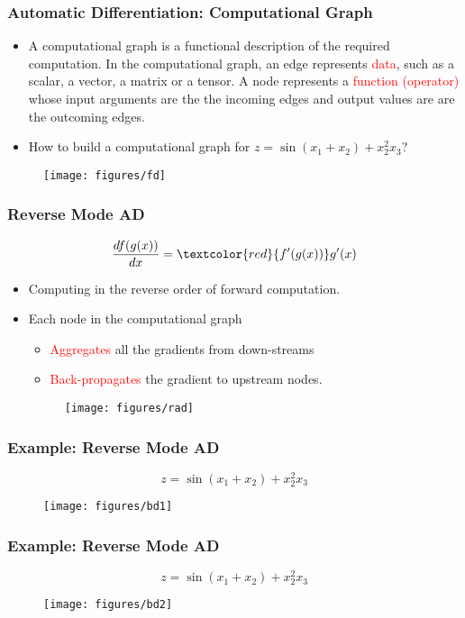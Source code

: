 \documentclass[usenames,dvipsnames]{beamer}
\newcommand{\red}[1]{\textcolor{red}{#1}}
\begin{document}
\begin{frame}
	\frametitle{Automatic Differentiation: Computational Graph}
	
	\begin{itemize}
		\item A computational graph is a functional description of the required computation. In the computational graph, an edge represents \textcolor{red}{data}, such as a scalar, a vector, a matrix or a tensor. A node represents a \textcolor{red}{function (operator)} whose input arguments are the the incoming edges and output values are are the outcoming edges. 
		\item How to build a computational graph for $z = \sin(x_1+x_2) + x_2^2 x_3$?
	\end{itemize}
	
	\begin{figure}[hbt]
  \texttt{[image: figures/fd]}
\end{figure}
\end{frame}

\begin{frame}
	\frametitle{Reverse Mode AD}
	$$\frac{df(g(x))}{dx} = \red{f'(g(x))} g'(x)$$
	\begin{itemize}
		\item Computing in the reverse order of forward computation. 
		\item Each node in the computational graph
		\begin{itemize}
		\item \red{Aggregates} all the gradients from down-streams 
		\item \red{Back-propagates} the gradient to upstream nodes.  
		\end{itemize}
		\begin{figure}[hbt]
  \texttt{[image: figures/rad]}
\end{figure}

	\end{itemize}
\end{frame}


\begin{frame}
\frametitle{Example: Reverse Mode AD}	
$$z=\sin(x_1+x_2) + x_2^2x_3$$
\begin{figure}[hbt]
\centering
  \texttt{[image: figures/bd1]}
\end{figure}

  
\end{frame}

\begin{frame}
\frametitle{Example: Reverse Mode AD}	
$$z=\sin(x_1+x_2) + x_2^2x_3$$
\begin{figure}[hbt]
\centering
  \texttt{[image: figures/bd2]}
\end{figure}
\end{frame}
\end{document}
